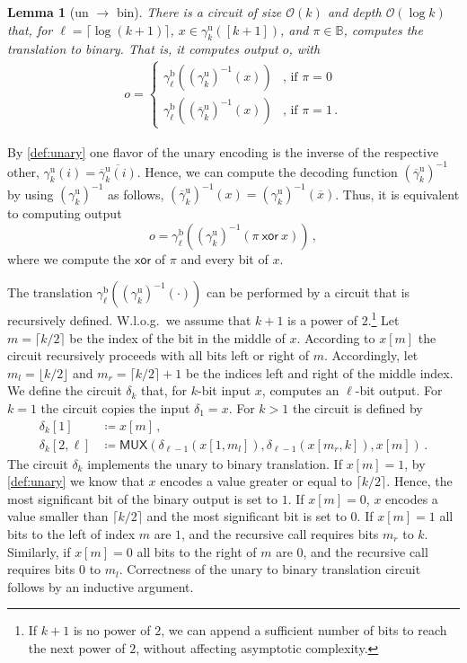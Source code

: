 \documentclass[9pt,journal,compsoc]{IEEEtran}
\newtheorem{lemma}[theorem]{Lemma}
\theoremstyle{remark}
\newcommand{\IB}{\mathbb{B}}
\newcommand{\XOR}{\textsf{xor}}
\newcommand{\MUX}{\textsf{MUX}}
\newcommand{\ceil}[1]{\lceil{#1}\rceil}
\newcommand{\floor}[1]{\lfloor{#1}\rfloor}
\newcommand{\gBin}[1]{\gamma_{#1}^{\operatorname{b}}}
\newcommand{\gUnary}[1]{\gamma_{#1}^{\operatorname{u}}}
\newcommand{\gbUnary}[1]{\overline{\gamma}_{#1}^{\operatorname{u}}}
\newcommand{\BO}{\mathcal{O}}
\begin{document}
\begin{lemma}[un $\rightarrow$ bin]\label{lem:untobin}
  There is a circuit of size $\BO(k)$ and depth $\BO(\log k)$ that, for
    $\ell=\ceil{\log(k+1)}$, $x\in\gUnary{k}([k+1])$, and $\pi\in\IB$,
    computes the translation to binary.
  That is, it computes output $o$, with
  \begin{align*}
    o =
    \begin{cases}
      \gBin{\ell}((\gUnary{k})^{-1}(x)) & \text{, if } \pi=0 \\
      \gBin{\ell}((\gbUnary{k})^{-1}(x)) & \text{, if } \pi=1\,.
    \end{cases}
  \end{align*}
\end{lemma}
\begin{IEEEproof}
  By \cref{def:unary} one flavor of the unary encoding is the inverse of the respective other, 
    $\gUnary{k}(i)=\overline{\gbUnary{k}(i)}$.
  Hence, we can compute the decoding function $(\gbUnary{k})^{-1}$ by 
    using $(\gUnary{k})^{-1}$ as follows,
    $(\gbUnary{k})^{-1}(x)=(\gUnary{k})^{-1}(\overline{x})$. 
  Thus, it is equivalent to computing output
  \begin{equation*}
    o=\gBin{\ell}((\gUnary{k})^{-1}(\pi\ \XOR\ x))\,,
  \end{equation*}
  where we compute the $\XOR$ of $\pi$ and every bit of $x$.

  The translation $\gBin{\ell}((\gUnary{k})^{-1}(\cdot))$
    can be performed by a circuit that is recursively defined.
  W.l.o.g.\ we assume that $k+1$ is a power of $2$.\footnote{If $k+1$ is no power of $2$, we can append a sufficient number of bits to reach the next power of $2$, without affecting asymptotic complexity.}
  Let $m=\ceil{k/2}$ be the index of the bit in the middle of $x$.
  According to $x[m]$ the circuit recursively proceeds with all bits
    left or right of $m$. 
  Accordingly, let $m_l=\floor{k/2}$ and $m_r=\ceil{k/2}+1$ be the 
    indices left and right of the middle index.
  We define the circuit $\delta_k$ that, for $k$-bit input $x$, computes
    an $\ell$-bit output.
  For $k=1$ the circuit copies the input $\delta_1 = x$.
  For $k>1$ the circuit is defined by
  \begin{align*}
    \delta_k[1]&\coloneqq x[m]\,, \\
    \delta_k[2,\ell]&\coloneqq
    \MUX(\delta_{\ell-1}(x[1,m_l]),\delta_{\ell-1}(x[m_r,k]),x[m])\,.
  \end{align*}
  The circuit $\delta_k$ implements the unary to binary 
    translation.
  If $x[m]=1$, by \cref{def:unary} we know that $x$ encodes a value greater 
    or equal to $\ceil{k/2}$.
  Hence, the most significant bit of the binary output is set to $1$.
  If $x[m]=0$, $x$ encodes a value smaller than $\ceil{k/2}$ and
    the most significant bit is set to $0$.
  If $x[m]=1$ all bits to the left of index $m$ are $1$, and the recursive call requires bits $m_r$ to $k$.
  Similarly, if $x[m]=0$ all bits to the right of $m$ are $0$, and the recursive call requires bits $0$ to $m_l$. 
  Correctness of the unary to binary translation circuit follows by an inductive argument.


\end{IEEEproof}
\end{document}
